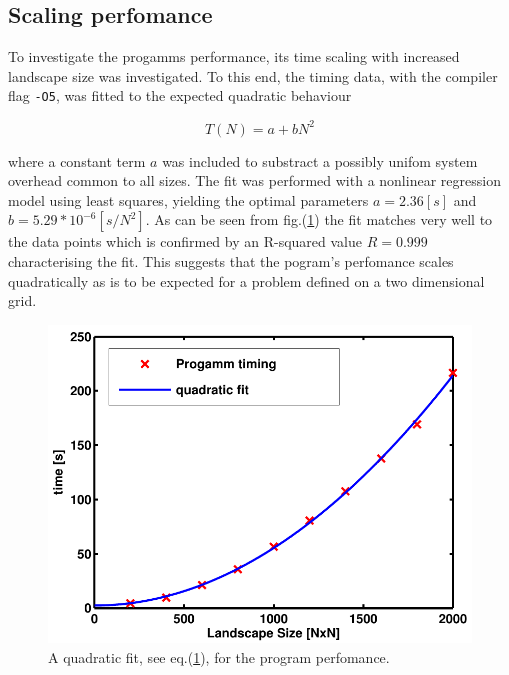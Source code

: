 \subsection{Scaling perfomance}
\label{subsec:scaling pefomance}

To investigate the progamms performance, its time scaling with increased landscape size was investigated.
To this end, the timing data, with the compiler flag  \texttt{-O5}, was fitted to the expected quadratic behaviour

\begin{equation}
 T(N)=a+bN^2
\label{eq:fitting curve}
\end{equation}

where a constant term $a$ was included to substract a possibly unifom system overhead common to all sizes.
The fit was performed with a nonlinear regression model using least squares, yielding the optimal parameters $a=2.36 [s]$ and $b=5.29*10^{-6} [s/N^2]$.
As can be seen from fig.(\ref{fig:fitting curve}) the fit matches very well to the data points which is confirmed by an R-squared value $R=0.999$ characterising the fit.
This suggests that the pogram's perfomance scales quadratically as is to be expected for a problem defined on a two dimensional grid.

\begin{figure}
 \includegraphics{Figures/TimingFitO5.pdf}
\caption{A quadratic fit, see eq.(\ref{fig:fitting curve}), for the program perfomance.}
\label{fig:fitting curve}
\end{figure}








